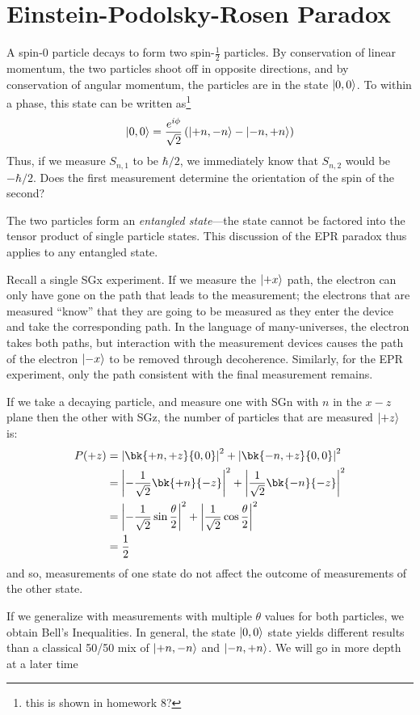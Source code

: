 \section{Einstein-Podolsky-Rosen Paradox}
A spin-0 particle decays to form two spin-\(\frac{1}{2}\) particles. By conservation of linear momentum, the two particles shoot off in opposite directions, and by conservation of angular momentum, the particles are in the state \(\lvert0,0\rangle\). To within a phase, this state can be written as\footnote{this is shown in homework 8?}
\begin{equation}
	\lvert0,0\rangle=\frac{e^{i\phi}}{\sqrt{2}}\left(\lvert+n,-n\rangle-\lvert-n,+n\rangle\right)
\end{equation}
Thus, if we measure \(S_{n,1}\) to be \(\hbar/2\), we immediately know that \(S_{n,2}\) would be \(-\hbar/2\). Does the first measurement determine the orientation of the spin of the second? 

The two particles form an \emph{entangled state}---the state cannot be factored into the tensor product of single particle states. This discussion of the EPR paradox thus applies to any entangled state.

Recall a single SGx experiment. If we measure the \(\lvert+x\rangle\) path, the electron can only have gone on the path that leads to the measurement; the electrons that are measured ``know'' that they are going to be measured as they enter the device and take the corresponding path. In the language of many-universes, the electron takes both paths, but interaction with the measurement devices causes the path of the electron \(\lvert-x\rangle\) to be removed through decoherence. Similarly, for the EPR experiment, only the path consistent with the final measurement remains.

If we take a decaying particle, and measure one with SGn with \(n\) in the \(x-z\) plane then the other with SGz, the number of particles that are measured \(\lvert+z\rangle\) is:
\begin{align*}
	P(+z)&=\abs{\bk{+n,+z}{0,0}}^2+\abs{\bk{-n,+z}{0,0}}^2\\
	     &=\abs{-\frac{1}{\sqrt{2}}\bk{+n}{-z}}^2+\abs{\frac{1}{\sqrt{2}}\bk{-n}{-z}}^2\\
	     &=\abs{-\frac{1}{\sqrt{2}}\sin\frac\theta2}^2+\abs{\frac{1}{\sqrt{2}}\cos\frac\theta2}^2\\
	     &=\frac{1}{2}
\end{align*}
and so, measurements of one state do not affect the outcome of measurements of the other state.

\begin{aside}
If we generalize with measurements with multiple \(\theta\) values for both particles, we obtain Bell's Inequalities. In general, the state \(\lvert0,0\rangle\) state yields different results than a classical 50/50 mix of \(\lvert+n,-n\rangle\) and \(\lvert-n,+n\rangle\). We will go in more depth at a later time
\end{aside}

